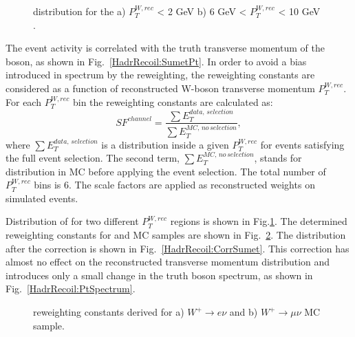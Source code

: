 \begin{figure}[!tbp]
\begin{minipage}[h]{0.49\linewidth}
\end{minipage}
\hfill
\begin{minipage}[h]{0.49\linewidth}
\end{minipage}
\caption{\sumet distribution for the a) $P_T^{W, rec}$ < 2 GeV b) 6 GeV < $P_T^{W, rec}$ < 10 GeV .}
\label{ris:SumEtCorPtW}
\end{figure}


The event activity \sumet is correlated with the truth transverse momentum of the boson, as shown in Fig.~\ref{HadrRecoil:SumetPt}.  In order to avoid a bias introduced in \ptw spectrum by the reweighting, the reweighting constants are considered as a function of reconstructed W-boson transverse momentum $P_T^{W, rec}$. For each $P_T^{W, rec}$ bin the reweighting constants are calculated as:
\begin{equation}
SF^{channel}=\frac{\sum E_T^{data, \, selection} }{\sum E_T^{MC,\, no\, selection} },
\end{equation}
where $\sum E_T^{data,\, selection} $ is a \sumet distribution inside a given $P_T^{W, rec}$ for events satisfying the full event selection. The second term, $\sum E_T^{MC,\, no\, selection}$, stands for \sumet distribution in MC before applying the event selection. The total number of $P_T^{W, rec}$ bins is 6. The scale factors are applied as  reconstructed weights on simulated events.

Distribution of \sumet for two different $P_T^{W, rec}$ regions is shown in Fig.\ref{ris:SumEtCorPtW}. The determined reweighting constants for \wenu and \wmunu MC samples are shown in Fig.~\ref{ris:SumEtCorNoPol}. The \sumet distribution after the correction is shown in Fig.~\ref{HadrRecoil:CorrSumet}. This correction has almost no effect on the reconstructed transverse momentum distribution and introduces only a small change in the truth boson spectrum, as shown in Fig.~\ref{HadrRecoil:PtSpectrum}. 


\begin{figure}[!tbp]
\begin{minipage}[h]{0.49\linewidth}
\end{minipage}
\hfill
\begin{minipage}[h]{0.49\linewidth}
\end{minipage}
\caption{\sumet reweighting constants derived for a) $W^{+} \to e \nu$ and b) $W^{+} \to \mu \nu$ MC sample.}
\label{ris:SumEtCorNoPol}
\end{figure}

